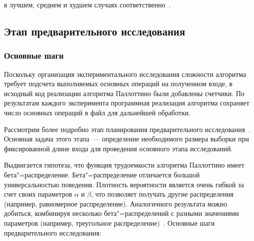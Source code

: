 \documentclass[a4paper, article, 12pt]{extarticle}
\begin{document}
в лучшем, среднем и худшем случаях соответственно~\cite{pallottino}.

\subsection{Этап предварительного исследования}\label{sec:analysis_part_1}

\subsubsection{Основные шаги}\label{subsec:analysis_part_1_intro}

Поскольку организация экспериментального исследования сложности алгоритма требует подсчета выполняемых основных операций на полученном входе, в исходный код реализации алгоритма Паллоттино были добавлены счетчики. По результатам каждого эксперимента программная реализация алгоритма сохраняет число основных операций в файл для дальнейшей обработки.

Рассмотрим более подробно этап планирования предварительного исследования~\cite{petrushyn_ulyanov_planning}. Основная задача этого этапа~--- определение необходимого размера выборки при фиксированной длине входа для проведения основного этапа исследований.

Выдвигается гипотеза, что функция трудоемкости алгоритма Паллоттино имеет бета"=распределение. Бета"=распределение отличается большой универсальностью поведения. Плотность вероятности является очень гибкой за счет своих параметров $\alpha$ и $\beta$, что позволяет получать другие распределения (например, равномерное распределение). Аналогичного результата можно добиться, комбинируя несколько бета"=распределений с разными значениями параметров (например, треугольное распределение)~\cite{petrushyn_ulyanov_definitions}. Основные шаги предварительного исследования:
\end{document}
